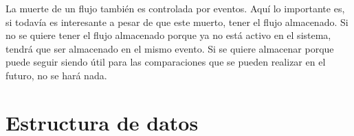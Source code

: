 \intro La muerte de un flujo también es controlada por eventos. Aquí lo importante es, si todavía es interesante 
a pesar de que este muerto, tener el flujo almacenado. Si no se quiere tener el flujo almacenado porque ya no 
está activo en el sistema, tendrá que ser almacenado en el mismo evento. Si se quiere almacenar porque puede 
seguir siendo útil para las comparaciones que se pueden realizar en el futuro, no se hará nada. 



\section{Estructura de datos}
